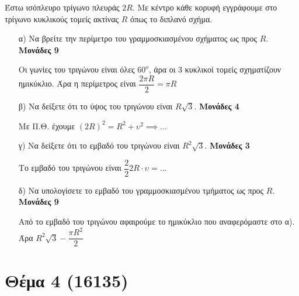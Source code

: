 \documentclass[12pt]{extarticle}
\begin{document}
Έστω ισόπλευρο τρίγωνο πλευράς $2R$. Με κέντρο κάθε κορυφή εγγράφουμε στο τρίγωνο κυκλικούς τομείς ακτίνας $R$ όπως το διπλανό σχήμα.
\begin{enumerate}
    \item[α)] Να βρείτε την περίμετρο του γραμμοσκιασμένου σχήματος ως προς $R$. \hspace*{\fill} \textbf{Μονάδες 9}

        Οι γωνίες του τριγώνου είναι όλες $60^ο$, άρα οι 3 κυκλικοί τομείς σχηματίζουν ημικύκλιο. Άρα η περίμετρος είναι $\dfrac{2πR}{2}=πR$
    \item[β)] Να δείξετε ότι το ύψος του τριγώνου είναι $R\sqrt{3}$. \hspace*{\fill} \textbf{Μονάδες 4}

        Με Π.Θ. έχουμε $(2R)^2=R^2+υ^2\implies ...$
    \item[γ)] Να δείξετε ότι το εμβαδό του τριγώνου είναι $R^2\sqrt{3}$. \hspace*{\fill} \textbf{Μονάδες 3}

        Το εμβαδό του τριγώνου είναι $\dfrac{2}{2}2R\cdot υ=...$
    \item[δ)] Να υπολογίσετε το εμβαδό του γραμμοσκιασμένου τμήματος ως προς $R$. \hspace*{\fill} \textbf{Μονάδες 9}

        Από το εμβαδό του τριγώνου αφαιρούμε το ημικύκλιο που αναφερόμαστε στο α). Άρα $R^2\sqrt{3}-\dfrac{πR^2}{2}$
\end{enumerate}

\section*{Θέμα 4 (16135)}
\noindent
\end{document}
